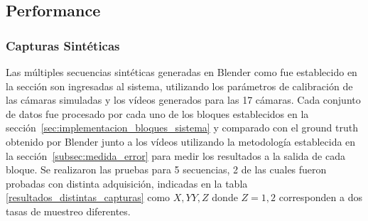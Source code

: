 \subsection{Performance}

\subsubsection{Capturas Sintéticas}

Las múltiples secuencias sintéticas generadas en Blender como fue establecido en la sección\label{seccion_Base_Datos_Sintetica} son ingresadas al sistema, utilizando los parámetros de calibración de las cámaras simuladas y los vídeos generados para las 17 cámaras. Cada conjunto de datos fue procesado por cada uno de los bloques establecidos en la sección~\ref{sec:implementacion_bloques_sistema} y comparado con el ground truth obtenido por Blender junto a los vídeos utilizando la metodología establecida en la sección~\ref{subsec:medida_error} para medir los resultados a la salida de cada bloque. Se realizaron las pruebas para 5 secuencias, 2 de las cuales fueron probadas con distinta adquisición, indicadas en la tabla \ref{resultados_distintas_capturas} como $X,YY,Z$ donde $Z=1,2$ corresponden a dos tasas de muestreo diferentes.

